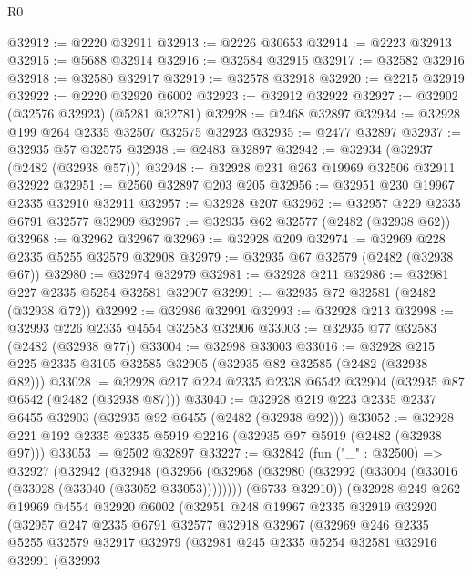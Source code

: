 \begin{lexlean}{R0}
\begin{coremodule}
@32912 := @2220 @32911
@32913 := @2226 @30653
@32914 := @2223 @32913
@32915 := @5688 @32914
@32916 := @32584 @32915
@32917 := @32582 @32916
@32918 := @32580 @32917
@32919 := @32578 @32918
@32920 := @2215 @32919
@32922 := @2220 @32920 @6002
@32923 := @32912 @32922
@32927 := @32902 (@32576 @32923) (@5281 @32781)
@32928 := @2468 @32897
@32934 := @32928 @199 @264 @2335 @32507 @32575 @32923
@32935 := @2477 @32897
@32937 := @32935 @57 @32575
@32938 := @2483 @32897
@32942 := @32934 (@32937 (@2482 (@32938 @57)))
@32948 := @32928 @231 @263 @19969 @32506 @32911 @32922
@32951 := @2560 @32897 @203 @205
@32956 := @32951 @230 @19967 @2335 @32910 @32911
@32957 := @32928 @207
@32962 := @32957 @229 @2335 @6791 @32577 @32909
@32967 := @32935 @62 @32577 (@2482 (@32938 @62))
@32968 := @32962 @32967
@32969 := @32928 @209
@32974 := @32969 @228 @2335 @5255 @32579 @32908
@32979 := @32935 @67 @32579 (@2482 (@32938 @67))
@32980 := @32974 @32979
@32981 := @32928 @211
@32986 := @32981 @227 @2335 @5254 @32581 @32907
@32991 := @32935 @72 @32581 (@2482 (@32938 @72))
@32992 := @32986 @32991
@32993 := @32928 @213
@32998 := @32993 @226 @2335 @4554 @32583 @32906
@33003 := @32935 @77 @32583 (@2482 (@32938 @77))
@33004 := @32998 @33003
@33016 := @32928 @215 @225 @2335 @3105 @32585 @32905 (@32935 @82 @32585 (@2482 (@32938 @82)))
@33028 := @32928 @217 @224 @2335 @2338 @6542 @32904 (@32935 @87 @6542 (@2482 (@32938 @87)))
@33040 := @32928 @219 @223 @2335 @2337 @6455 @32903 (@32935 @92 @6455 (@2482 (@32938 @92)))
@33052 := @32928 @221 @192 @2335 @2335 @5919 @2216 (@32935 @97 @5919 (@2482 (@32938 @97)))
@33053 := @2502 @32897
@33227 := @32842
    (fun ("_" : @32500) =>
    @32927
      (@32942
        (@32948
          (@32956
            (@32968 (@32980 (@32992 (@33004 (@33016 (@33028 (@33040 (@33052 @33053))))))))
            (@6733 @32910))
          (@32928
            @249
            @262
            @19969
            @4554
            @32920
            @6002
            (@32951
              @248
              @19967
              @2335
              @32919
              @32920
              (@32957
                @247
                @2335
                @6791
                @32577
                @32918
                @32967
                (@32969
                  @246
                  @2335
                  @5255
                  @32579
                  @32917
                  @32979
                  (@32981
                    @245
                    @2335
                    @5254
                    @32581
                    @32916
                    @32991
                    (@32993

\end{coremodule}
\end{lexlean}

